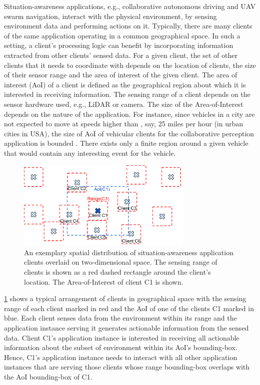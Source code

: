 Situation-awareness applications, e.g., collaborative autonomous driving and UAV swarm navigation, interact with the physical environment, by sensing environment data and performing actions on it. Typically, there are many clients of the same application operating in a common geographical space. In such a setting, a client's processing logic can benefit by incorporating information extracted from other clients' sensed data. For a given client, the set of other clients that it needs to coordinate with depends on the location of clients, the size of their sensor range and the area of interest of the given client. The area of interest (AoI) of a client is defined as the geographical region about which it is interested in receiving information. The sensing range of a client depends on the sensor hardware used, e.g., LiDAR or camera. The size of the Area-of-Interest depends on the nature of the application. For instance, since vehicles in a city are not expected to move at speeds higher than , say, 25 miles per hour (in urban cities in USA), the size of AoI of vehicular clients for the collaborative perception application is bounded . There exists only a finite region around a given vehicle that would contain any interesting event for the vehicle.
\begin{figure}
\centering
\includegraphics[width=0.75\textwidth]{figures/mechanisms/spatial_ctx_mgmt/aoi_range.pdf}
\caption{An exemplary spatial distribution of situation-awareness application clients overlaid on two-dimensional space. The sensing range of clients is shown as a red dashed rectangle around the client's location. The Area-of-Interest of client C1 is shown.}
\label{fig:aoi_range}
\end{figure}
\cref{fig:aoi_range} shows a typical arrangement of clients in geographical space with the sensing range of each client marked in red and the AoI of one of the clients C1 marked in blue. Each client senses data from the environment within its range and the application instance serving it generates actionable information from the sensed data. Client C1's application instance is interested in receiving all actionable information about the subset of environment within its AoI's bounding-box. Hence, C1's application instance needs to interact with all other application instances that are serving those clients whose range bounding-box overlaps with the AoI bounding-box of C1. 

